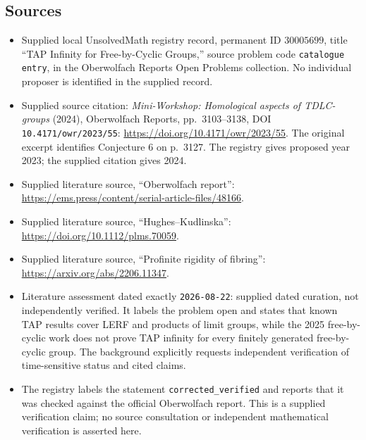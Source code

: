 \documentclass[11pt]{article}
\begin{document}
\subsection{Sources}
\begin{itemize}
\item Supplied local UnsolvedMath registry record, permanent ID \(30005699\), title ``TAP Infinity for Free-by-Cyclic Groups,'' source problem code \texttt{catalogue entry}, in the Oberwolfach Reports Open Problems collection. No individual proposer is identified in the supplied record.
\item Supplied source citation: \emph{Mini-Workshop: Homological aspects of TDLC-groups} (2024), Oberwolfach Reports, pp.\ 3103--3138, DOI \texttt{10.4171/owr/2023/55}: \url{https://doi.org/10.4171/owr/2023/55}. The original excerpt identifies Conjecture 6 on p.\ 3127. The registry gives proposed year 2023; the supplied citation gives 2024.
\item Supplied literature source, ``Oberwolfach report'': \url{https://ems.press/content/serial-article-files/48166}.
\item Supplied literature source, ``Hughes--Kudlinska'': \url{https://doi.org/10.1112/plms.70059}.
\item Supplied literature source, ``Profinite rigidity of fibring'': \url{https://arxiv.org/abs/2206.11347}.
\item Literature assessment dated exactly \texttt{2026-08-22}: supplied dated curation, not independently verified. It labels the problem open and states that known TAP results cover LERF and products of limit groups, while the 2025 free-by-cyclic work does not prove TAP infinity for every finitely generated free-by-cyclic group. The background explicitly requests independent verification of time-sensitive status and cited claims.
\item The registry labels the statement \texttt{corrected\_verified} and reports that it was checked against the official Oberwolfach report. This is a supplied verification claim; no source consultation or independent mathematical verification is asserted here.
\end{itemize}
\end{document}
